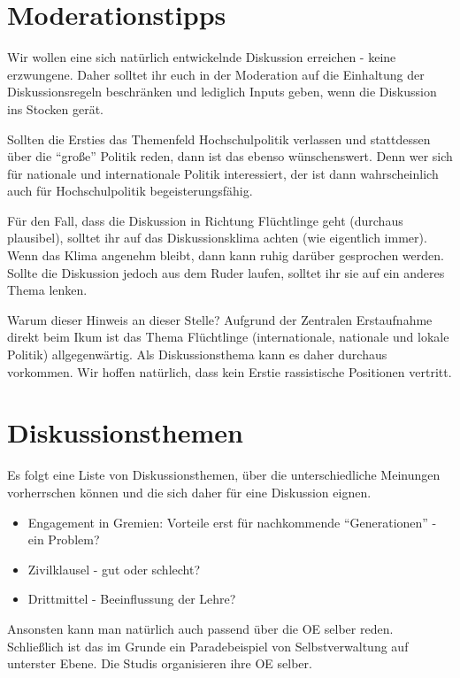 \documentclass[a4paper,11pt]{scrartcl} %
\newenvironment{myitemize}{\begin{itemize}\itemsep -2pt}{\end{itemize}} %
\begin{document}
\section{Moderationstipps}

Wir wollen eine sich natürlich entwickelnde Diskussion erreichen - keine erzwungene. Daher solltet
ihr euch in der Moderation auf die Einhaltung der Diskussionsregeln beschränken und lediglich Inputs
geben, wenn die Diskussion ins Stocken gerät.

Sollten die Ersties das Themenfeld Hochschulpolitik verlassen und stattdessen über die "`große"'
Politik reden, dann ist das ebenso wünschenswert. Denn wer sich für nationale und internationale
Politik interessiert, der ist dann wahrscheinlich auch für Hochschulpolitik begeisterungsfähig.

Für den Fall, dass die Diskussion in Richtung Flüchtlinge geht (durchaus plausibel), solltet ihr
auf das Diskussionsklima achten (wie eigentlich immer). Wenn das Klima angenehm bleibt, dann
kann ruhig darüber gesprochen werden. Sollte die Diskussion jedoch aus dem Ruder laufen,
solltet ihr sie auf ein anderes Thema lenken.

Warum dieser Hinweis an dieser Stelle? Aufgrund der Zentralen Erstaufnahme direkt beim Ikum
ist das Thema Flüchtlinge (internationale, nationale und lokale Politik) allgegenwärtig.
Als Diskussionsthema kann es daher durchaus vorkommen. Wir hoffen natürlich, dass kein Erstie
rassistische Positionen vertritt.

\section{Diskussionsthemen}

Es folgt eine Liste von Diskussionsthemen, über die unterschiedliche Meinungen vorherrschen können
und die sich daher für eine Diskussion eignen.

\begin{myitemize}
  \item Engagement in Gremien: Vorteile erst für nachkommende "`Generationen"' - ein Problem?
  \item Zivilklausel - gut oder schlecht?
  \item Drittmittel - Beeinflussung der Lehre?
\end{myitemize}

Ansonsten kann man natürlich auch passend über die OE selber reden. Schließlich ist das im Grunde
ein Paradebeispiel von Selbstverwaltung auf unterster Ebene. Die Studis organisieren ihre OE selber.
\end{document}
